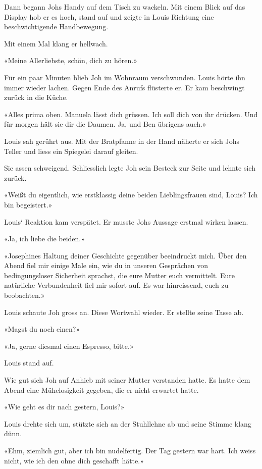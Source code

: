 Dann begann Johs Handy auf dem Tisch zu wackeln. Mit einem Blick auf das
Display hob er es hoch, stand auf und zeigte in Louis Richtung eine
beschwichtigende Handbewegung.

Mit einem Mal klang er hellwach.

«Meine Allerliebste, schön, dich zu hören.»

Für ein paar Minuten blieb Joh im Wohnraum verschwunden. Louis hörte ihn
immer wieder lachen. Gegen Ende des Anrufs flüsterte er. Er kam
beschwingt zurück in die Küche.

«Alles prima oben. Manuela lässt dich grüssen. Ich soll dich von ihr
drücken. Und für morgen hält sie dir die Daumen. Ja, und Ben übrigens
auch.»

Louis sah gerührt aus. Mit der Bratpfanne in der Hand näherte er sich
Johs Teller und liess ein Spiegelei darauf gleiten.

Sie assen schweigend. Schliesslich legte Joh sein Besteck zur Seite und
lehnte sich zurück.

«Weißt du eigentlich, wie erstklassig deine beiden Lieblingsfrauen sind,
Louis? Ich bin begeistert.»

Louis` Reaktion kam verspätet. Er musste Johs Aussage erstmal wirken
lassen.

«Ja, ich liebe die beiden.»

«Josephines Haltung deiner Geschichte gegenüber beeindruckt mich. Über
den Abend fiel mir einige Male ein, wie du in unseren Gesprächen von
bedingungsloser Sicherheit sprachst, die eure Mutter euch vermittelt.
Eure natürliche Verbundenheit fiel mir sofort auf. Es war hinreissend,
euch zu beobachten.»

Louis schaute Joh gross an. Diese Wortwahl wieder. Er stellte seine
Tasse ab.

«Magst du noch einen?»

«Ja, gerne diesmal einen Espresso, bitte.»

Louis stand auf.

Wie gut sich Joh auf Anhieb mit seiner Mutter verstanden hatte. Es hatte
dem Abend eine Mühelosigkeit gegeben, die er nicht erwartet hatte.

«Wie geht es dir nach gestern, Louis?»

Louis drehte sich um, stützte sich an der Stuhllehne ab und seine Stimme
klang dünn.

«Ehm, ziemlich gut, aber ich bin nudelfertig. Der Tag gestern war hart.
Ich weiss nicht, wie ich den ohne dich geschafft hätte.»

